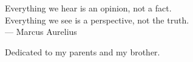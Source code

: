 \thispagestyle{empty}


\vspace*{3cm}

\begin{center}
    Everything we hear is an opinion, not a fact. \\ Everything we see is a perspective, not the truth.  \\ \medskip
    --- Marcus Aurelius 
\end{center}

\medskip

\begin{center}
    Dedicated to my parents and my brother.
\end{center}